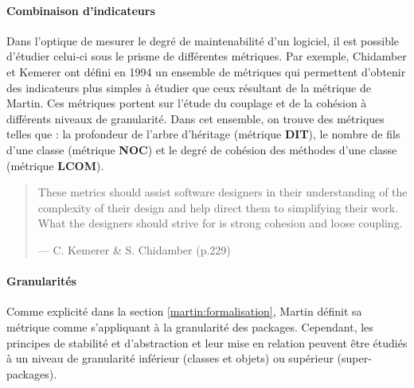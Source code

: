 \documentclass{scrartcl}
\begin{document}
    \paragraph{Combinaison d'indicateurs}Dans l'optique de mesurer le degré de maintenabilité d'un logiciel, il est possible d'étudier celui-ci sous le prisme de différentes métriques.
    Par exemple, Chidamber et Kemerer ont défini en 1994 un ensemble de métriques\cite{ChidamberKemerer:1994} qui permettent d'obtenir des indicateurs plus simples à étudier que ceux résultant de la métrique de Martin. Ces métriques portent sur l'étude du couplage et de la cohésion à différents niveaux de granularité.
    Dans cet ensemble, on trouve des métriques telles que : la profondeur de l'arbre d'héritage (métrique \textbf{DIT}), le nombre de fils d'une classe (métrique \textbf{NOC}) et le degré de cohésion des méthodes d'une classe (métrique \textbf{LCOM}).
    
    \begin{quote}
        These metrics should assist software designers in their understanding of the complexity of their design and help direct them to simplifying their work. What the designers should strive for is strong cohesion and loose coupling.
        \begin{flushright}--- C. Kemerer \& S. Chidamber \cite{ChidamberKemerer:1994} (p.229)\end{flushright}
    \end{quote}

    \paragraph{Granularités}Comme explicité dans la section \ref{martin:formalisation}, Martin définit sa métrique comme s'appliquant à la granularité des packages. Cependant, les principes de stabilité et d'abstraction et leur mise en relation peuvent être étudiés à un niveau de granularité inférieur (classes et objets) ou supérieur (super-packages).
    
\end{document}
